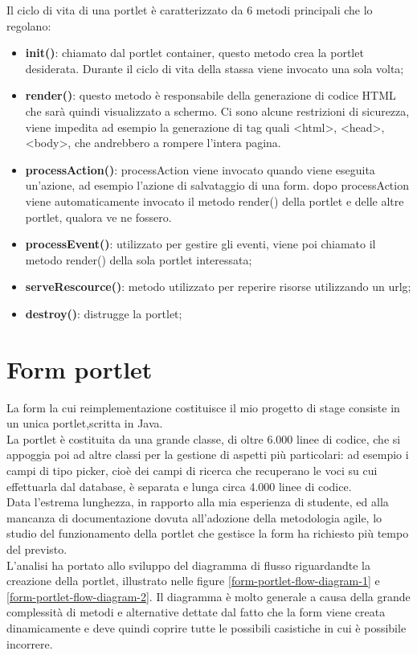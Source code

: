 Il ciclo di vita di una \gls{portlet} è caratterizzato da 6 metodi principali che lo regolano:
\begin{itemize}
	\item \textbf{init()}: chiamato dal portlet container, questo metodo crea la \gls{portlet} desiderata. Durante il ciclo di vita della stassa viene invocato una sola volta;
	\item \textbf{render()}: questo metodo è responsabile della generazione di codice HTML che sarà quindi visualizzato a schermo. Ci sono alcune restrizioni di sicurezza, viene impedita ad esempio la generazione di tag quali <html>, <head>, <body>, che andrebbero a rompere l'intera pagina.
	\item \textbf{processAction()}: processAction viene invocato quando viene eseguita un'azione, ad esempio l'azione di salvataggio di una form. dopo processAction viene automaticamente invocato il metodo render() della portlet e delle altre \gls{portlet}, qualora ve ne fossero.
	\item \textbf{processEvent()}: utilizzato per gestire gli eventi, viene poi chiamato il metodo render() della sola \gls{portlet} interessata;
	\item \textbf{serveRescource()}: metodo utilizzato per reperire risorse utilizzando un \gls{urlg};
	\item \textbf{destroy()}: distrugge la \gls{portlet};
\end{itemize}	
\newpage
\section{Form portlet}
La form la cui reimplementazione costituisce il mio progetto di stage consiste in un unica portlet,scritta in Java. \\
La portlet è costituita da una grande classe, di oltre 6.000 linee di codice, che si appoggia poi ad altre classi per la gestione di aspetti più particolari: ad esempio i campi di tipo picker, cioè dei campi di ricerca che recuperano le voci su cui effettuarla dal database, è separata e lunga circa 4.000 linee di codice.\\
Data l'estrema lunghezza, in rapporto alla mia esperienza di studente, ed alla mancanza di documentazione dovuta all'adozione della metodologia agile, lo studio del funzionamento della portlet che gestisce la form ha richiesto più tempo del previsto. \\ 
L'analisi ha portato allo sviluppo del diagramma di flusso riguardandte la creazione della \gls{portlet}, illustrato nelle figure \ref{form-portlet-flow-diagram-1} e \ref{form-portlet-flow-diagram-2}. Il diagramma è molto generale a causa della grande complessità di metodi e alternative dettate dal fatto che la form viene creata dinamicamente e deve quindi coprire tutte le possibili casistiche in cui è possibile incorrere.\\

